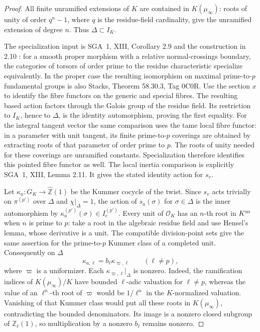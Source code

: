 \begin{proof}
All finite unramified extensions of $K$ are contained in
$K(\mu_\infty)$: roots of unity of order $q^n-1$, where $q$ is the
residue-field cardinality, give the unramified extension of degree $n$.
Thus $\Delta\subset I_K$.

The specialization input is SGA~1, XIII, Corollary 2.9 and the
construction in 2.10 \cite{D_SGA1}: for a smooth proper morphism with
a relative normal-crossings boundary, the categories of torsors of
order prime to the residue characteristic specialize equivalently.
In the proper case the resulting isomorphism on maximal prime-to-$p$
fundamental groups is also Stacks, Theorem 58.30.3, Tag 0C0R.
Use the section $x$ to identify the fibre functors on the generic and
special fibres.  The resulting based action factors through the
Galois group of the residue field.  Its restriction to $I_K$, hence to
$\Delta$, is the identity automorphism, proving the first equality.
For the integral tangent vector the same comparison uses the tame
local fibre functor: in a parameter with unit tangent, its finite
prime-to-$p$ coverings are obtained by extracting roots of that
parameter of order prime to $p$.  The roots of unity needed for these
coverings are unramified constants.  Specialization therefore
identifies this pointed fibre functor as well.  The local inertia
comparison is explicitly SGA~1, XIII, Lemma 2.11.  It gives the stated
identity action for $s_v$.

Let $\kappa_a:G_K\to\widehat{\mathbb Z}(1)$ be the Kummer cocycle of
the twist.  Since $s_v$ acts trivially on $\pi^{(p')}$ over $\Delta$
and $\chi|_\Delta=1$, the action of $s_a(\sigma)$ for $\sigma\in\Delta$
is the inner automorphism by $\kappa_a^{(p')}(\sigma)\in I_c^{(p')}$.
Every unit of $\mathcal O_K$ has an $n$-th root in $K^{\rm nr}$ when
$n$ is prime to $p$: take a root in the algebraic residue field and
use Hensel's lemma, whose derivative is a unit.  The compatible
division-point sets give the same assertion for the prime-to-$p$
Kummer class of a completed unit.  Consequently on $\Delta$
\[
       \kappa_{a,\ell}=b_\ell\kappa_{\varpi,\ell}\qquad(\ell\ne p),
\]
where $\varpi$ is a uniformizer.
Each $\kappa_{\varpi,\ell}|_\Delta$ is nonzero.  Indeed, the
ramification indices of $K(\mu_\infty)/K$ have bounded
$\ell$-adic valuation for $\ell\ne p$, whereas the value of an
$\ell^n$-th root of $\varpi$ would be $1/\ell^n$ in the
$K$-normalized valuation.  Vanishing of that Kummer class would put
all these roots in $K(\mu_\infty)$, contradicting the bounded
denominators.  Its image is a nonzero closed subgroup of
$\mathbb Z_\ell(1)$, so multiplication by a nonzero $b_\ell$ remains
nonzero.


\end{proof}
